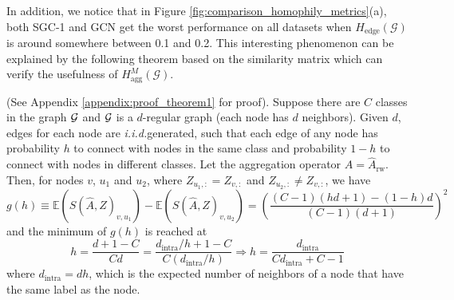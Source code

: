 \documentclass{article}
\newcommand\iid{\textit{i.i.d.}}
\newcommand{\0}{{\boldsymbol{0}}}
\newcommand{\6}{{\partial}}
\newcommand{\8}{{\infty}}
\newcommand{\4}{{\nabla}}
\newenvironment{theorem}[2][Theorem]{\begin{trivlist}
		\item[\hskip \labelsep {\bfseries #1}\hskip \labelsep {\bfseries #2.}]}{\end{trivlist}}
\begin{document}
In addition, we notice that in Figure \ref{fig:comparison_homophily_metrics}(a), both SGC-1 and GCN get the worst performance on all datasets when $H_{\text{edge}}(\mathcal{G})$ is around somewhere between 0.1 and 0.2. This interesting phenomenon can be explained by the following theorem based on the similarity matrix which can verify the usefulness of $H_{\text{agg}}^M(\mathcal{G})$.
\begin{theorem} 1
(See Appendix \ref{appendix:proof_theorem1} for proof). Suppose there are $C$ classes in the graph $\cal G$ and $\cal G$ is a $d$-regular graph (each node has $d$ neighbors). Given $d$, edges for each node are \iid generated, such that each edge of any node has probability $h$ to connect with nodes in the same class and probability $1-h$ to connect with nodes in different classes. Let the aggregation operator $\hat{A} = \hat{A}_\text{rw}$. Then, for nodes $v$, $u_1$ and $u_2$, where $Z_{u_1,:}=Z_{v,:}$ and $Z_{u_2,:} \neq Z_{v,:}$, we have
\begin{equation}
\label{eq:theorem1_expectation_differences}
    g(h)\equiv 
    \mathbb{E}\left(S(\hat{A},Z)_{v,u_1}  \right) 
    - \mathbb{E}\left(S(\hat{A},Z)_{v,u_2}  \right)
   = \left(\frac{(C-1)(hd+1)-(1-h)d}{(C-1)(d+1)} \right)^2
\end{equation}
and the minimum of $g(h)$ is reached at 
$$
h=\frac{d+1-C}{Cd} = \frac{d_{\text{intra}}/h + 1 -C}{C (d_{\text{intra}}/h)}  \Rightarrow h=\frac{d_{\text{intra}}}{C d_{\text{intra}} +C-1}
$$
where $d_{\text{intra}}=dh$, which is the expected number of neighbors of a node that have the same label as the node.
\end{theorem}
\iffalse
\end{document}
